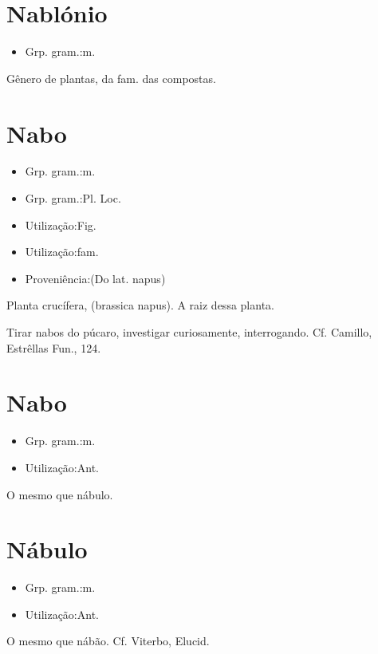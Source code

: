 \section{Nablónio}
\begin{itemize}
\item {Grp. gram.:m.}
\end{itemize}
Gênero de plantas, da fam. das compostas.
\section{Nabo}
\begin{itemize}
\item {Grp. gram.:m.}
\end{itemize}
\begin{itemize}
\item {Grp. gram.:Pl. Loc.}
\end{itemize}
\begin{itemize}
\item {Utilização:Fig.}
\end{itemize}
\begin{itemize}
\item {Utilização:fam.}
\end{itemize}
\begin{itemize}
\item {Proveniência:(Do lat. \textunderscore napus\textunderscore )}
\end{itemize}
Planta crucífera, (\textunderscore brassica napus\textunderscore ).
A raiz dessa planta.

\textunderscore Tirar nabos do púcaro\textunderscore , investigar curiosamente, interrogando. Cf. Camillo, \textunderscore Estrêllas Fun.\textunderscore , 124.
\section{Nabo}
\begin{itemize}
\item {Grp. gram.:m.}
\end{itemize}
\begin{itemize}
\item {Utilização:Ant.}
\end{itemize}
O mesmo que \textunderscore nábulo\textunderscore .
\section{Nábulo}
\begin{itemize}
\item {Grp. gram.:m.}
\end{itemize}
\begin{itemize}
\item {Utilização:Ant.}
\end{itemize}
O mesmo que \textunderscore nábão\textunderscore . Cf. Viterbo, \textunderscore Elucid.\textunderscore 
